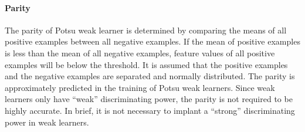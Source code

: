 \paragraph{Parity}
The parity of Potsu weak learner is determined by comparing the means of all positive examples between all negative examples. If the mean of positive examples is less than the mean of all negative examples, feature values of all positive examples will be below the threshold. It is assumed that the positive examples and the negative examples are separated and normally distributed.
The parity is approximately predicted in the training of Potsu weak learners. Since weak learners only have ``weak'' discriminating power, the parity is not required to be highly accurate. In brief, it is not necessary to implant a ``strong'' discriminating power in weak learners.

